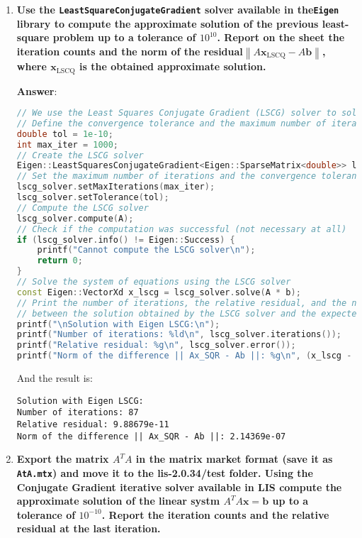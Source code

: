 \begin{enumerate}[label=\textcolor{Green3}{\textbf{\arabic*.}}]
    \newpage

    \item \textcolor{Green3}{\textbf{%
        Use the \texttt{LeastSquareConjugateGradient} solver available in the\break \texttt{Eigen} library to compute the approximate solution of the previous least-square problem up to a tolerance of $10^{10}$. Report on the sheet the iteration counts and the norm of the residual\break $\left\| A\mathbf{x}_{\text{LSCQ}} - A\mathbf{b} \right\|$, where $\mathbf{x}_{\text{LSCQ}}$ is the obtained approximate solution.
    }}

    \textbf{Answer}:
    \begin{lstlisting}[language=C++]
// We use the Least Squares Conjugate Gradient (LSCG) solver to solve the previous problem
// Define the convergence tolerance and the maximum number of iterations
double tol = 1e-10;
int max_iter = 1000;
// Create the LSCG solver
Eigen::LeastSquaresConjugateGradient<Eigen::SparseMatrix<double>> lscg_solver;
// Set the maximum number of iterations and the convergence tolerance
lscg_solver.setMaxIterations(max_iter);
lscg_solver.setTolerance(tol);
// Compute the LSCG solver
lscg_solver.compute(A);
// Check if the computation was successful (not necessary at all)
if (lscg_solver.info() != Eigen::Success) {
    printf("Cannot compute the LSCG solver\n");
    return 0;
}
// Solve the system of equations using the LSCG solver
const Eigen::VectorXd x_lscg = lscg_solver.solve(A * b);
// Print the number of iterations, the relative residual, and the norm of the difference
// between the solution obtained by the LSCG solver and the expected solution
printf("\nSolution with Eigen LSCG:\n");
printf("Number of iterations: %ld\n", lscg_solver.iterations());
printf("Relative residual: %g\n", lscg_solver.error());
printf("Norm of the difference || Ax_SQR - Ab ||: %g\n", (x_lscg - b).norm());
    \end{lstlisting}
    And the result is:
    \begin{lstlisting}
Solution with Eigen LSCG:
Number of iterations: 87
Relative residual: 9.88679e-11
Norm of the difference || Ax_SQR - Ab ||: 2.14369e-07\end{lstlisting}


    \newpage

    \item \textcolor{Green3}{\textbf{%
        Export the matrix $A^{T}A$ in the matrix market format (save it as \texttt{AtA.mtx}) and move it to the lis-2.0.34/test folder. Using the Conjugate Gradient iterative solver available in LIS compute the approximate solution of the linear systm $A^{T}A\mathbf{x} = \mathbf{b}$ up to a tolerance of $10^{-10}$. Report the iteration counts and the relative residual at the last iteration.
    }}


\end{enumerate}
